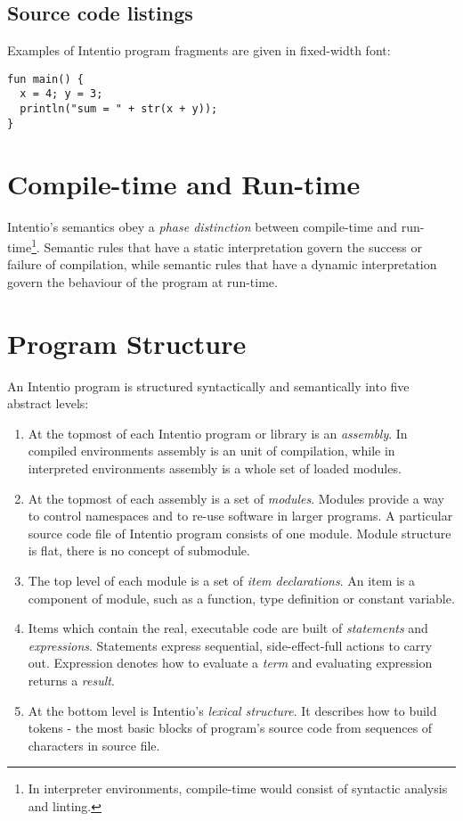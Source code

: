 \subsection*{Source code listings}

Examples of Intentio program fragments are given in fixed-width font:

\begin{lstlisting}
fun main() {
  x = 4; y = 3;
  println("sum = " + str(x + y));
}
\end{lstlisting}


\section{Compile-time and Run-time}

Intentio's semantics obey a \emph{phase distinction} between compile-time and run-time\footnote{In interpreter environments, compile-time would consist of syntactic analysis and linting.}. Semantic rules that have a static interpretation govern the success or failure of compilation, while semantic rules that have a dynamic interpretation govern the behaviour of the program at run-time.


\section{Program Structure}

An Intentio program is structured syntactically and semantically into five abstract levels:

\begin{enumerate}
  \item At the topmost of each Intentio program or library is an \emph{assembly}. In compiled environments assembly is an unit of compilation, while in interpreted environments assembly is a whole set of loaded modules.
  \item At the topmost of each assembly is a set of \emph{modules}. Modules provide a way to control namespaces and to re-use software in larger programs. A particular source code file of Intentio program consists of one module. Module structure is flat, there is no concept of submodule.
  \item The top level of each module is a set of \emph{item declarations}. An item is a component of module, such as a function, type definition or constant variable.
  \item Items which contain the real, executable code are built of \emph{statements} and \emph{expressions}. Statements express sequential, side-effect-full actions to carry out. Expression denotes how to evaluate a \emph{term} and evaluating expression returns a \emph{result}.
  \item At the bottom level is Intentio's \emph{lexical structure}. It describes how to build tokens - the most basic blocks of program's source code from sequences of characters in source file.
\end{enumerate}


